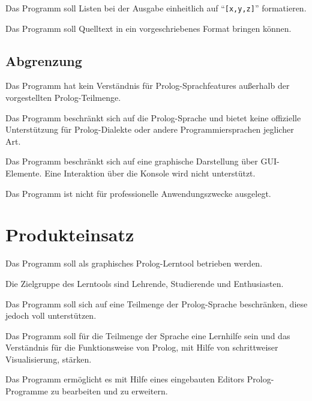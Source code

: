 \documentclass[parskip=full,11pt,twoside]{scrartcl}
\begin{document}

Das Programm soll Listen bei der Ausgabe einheitlich auf \enquote{\texttt{[x,y,z]}} formatieren.


Das Programm soll Quelltext in ein vorgeschriebenes Format bringen können.

\subsection{Abgrenzung}


Das Programm hat kein Verständnis für Prolog-Sprachfeatures außerhalb der vorgestellten Prolog-Teilmenge.


Das Programm beschränkt sich auf die Prolog-Sprache und bietet keine offizielle Unterstützung für Prolog-Dialekte oder andere Programmiersprachen jeglicher Art.


Das Programm beschränkt sich auf eine graphische Darstellung über GUI-Elemente. Eine Interaktion über die Konsole wird nicht unterstützt.


Das Programm ist nicht für professionelle Anwendungszwecke ausgelegt.

\pagebreak
\section{Produkteinsatz}

Das Programm soll als graphisches Prolog-Lerntool betrieben werden.

Die Zielgruppe des Lerntools sind Lehrende, Studierende und Enthusiasten.

Das Programm soll sich auf eine Teilmenge der Prolog-Sprache beschränken, diese jedoch voll unterstützen.

Das Programm soll für die Teilmenge der Sprache eine Lernhilfe sein und das Verständnis für die Funktionsweise von Prolog, mit Hilfe von schrittweiser Visualisierung, stärken.

Das Programm ermöglicht es mit Hilfe eines eingebauten Editors Prolog-Programme zu bearbeiten und zu erweitern.
\end{document}
